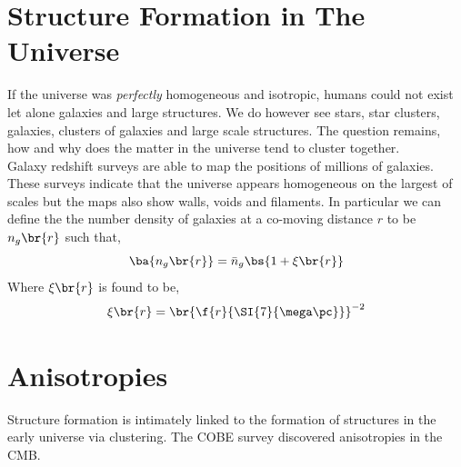 \documentclass{article}
\begin{document}
\section{Structure Formation in The Universe}

If the universe was \textit{perfectly} homogeneous and isotropic, humans could not exist let alone galaxies and large structures. We do however see stars, star clusters, galaxies, clusters of galaxies and large scale structures. The question remains, how and why does the matter in the universe tend to cluster together.\\

Galaxy redshift surveys are able to map the positions of millions of galaxies. These surveys indicate that the universe appears homogeneous on the largest of scales but the maps also show walls, voids and filaments. In particular we can define the the number density of galaxies at a co-moving distance $r$ to be $n_g\br{r}$ such that,
\[ \ba{n_g\br{r}} = \bar n_g \bs{1 + \xi\br{r}} \]
Where $\xi\br{r}$ is found to be,
\[ \xi\br{r} = \br{\f{r}{\SI{7}{\mega\pc}}}^{-2} \]

\section{Anisotropies}

Structure formation is intimately linked to the formation of structures in the early universe via clustering. The COBE survey discovered anisotropies in the CMB. \\
\end{document}
